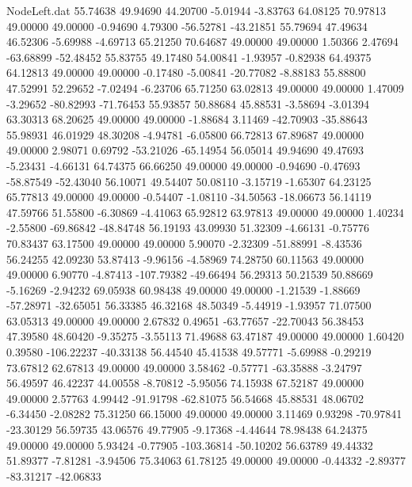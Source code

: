 \begin{filecontents}{NodeLeft.dat}
  55.74638   49.94690   44.20700    -5.01944   -3.83763   64.08125   70.97813   49.00000   49.00000   -0.94690    4.79300  -56.52781  -43.21851
  55.79694   47.49634   46.52306    -5.69988   -4.69713   65.21250   70.64687   49.00000   49.00000    1.50366    2.47694  -63.68899  -52.48452
  55.83755   49.17480   54.00841    -1.93957   -0.82938   64.49375   64.12813   49.00000   49.00000   -0.17480   -5.00841  -20.77082   -8.88183
  55.88800   47.52991   52.29652    -7.02494   -6.23706   65.71250   63.02813   49.00000   49.00000    1.47009   -3.29652  -80.82993  -71.76453
  55.93857   50.88684   45.88531    -3.58694   -3.01394   63.30313   68.20625   49.00000   49.00000   -1.88684    3.11469  -42.70903  -35.88643
  55.98931   46.01929   48.30208    -4.94781   -6.05800   66.72813   67.89687   49.00000   49.00000    2.98071    0.69792  -53.21026  -65.14954
  56.05014   49.94690   49.47693    -5.23431   -4.66131   64.74375   66.66250   49.00000   49.00000   -0.94690   -0.47693  -58.87549  -52.43040
  56.10071   49.54407   50.08110    -3.15719   -1.65307   64.23125   65.77813   49.00000   49.00000   -0.54407   -1.08110  -34.50563  -18.06673
  56.14119   47.59766   51.55800    -6.30869   -4.41063   65.92812   63.97813   49.00000   49.00000    1.40234   -2.55800  -69.86842  -48.84748
  56.19193   43.09930   51.32309    -4.66131   -0.75776   70.83437   63.17500   49.00000   49.00000    5.90070   -2.32309  -51.88991   -8.43536
  56.24255   42.09230   53.87413    -9.96156   -4.58969   74.28750   60.11563   49.00000   49.00000    6.90770   -4.87413 -107.79382  -49.66494
  56.29313   50.21539   50.88669    -5.16269   -2.94232   69.05938   60.98438   49.00000   49.00000   -1.21539   -1.88669  -57.28971  -32.65051
  56.33385   46.32168   48.50349    -5.44919   -1.93957   71.07500   63.05313   49.00000   49.00000    2.67832    0.49651  -63.77657  -22.70043
  56.38453   47.39580   48.60420    -9.35275   -3.55113   71.49688   63.47187   49.00000   49.00000    1.60420    0.39580 -106.22237  -40.33138
  56.44540   45.41538   49.57771    -5.69988   -0.29219   73.67812   62.67813   49.00000   49.00000    3.58462   -0.57771  -63.35888   -3.24797
  56.49597   46.42237   44.00558    -8.70812   -5.95056   74.15938   67.52187   49.00000   49.00000    2.57763    4.99442  -91.91798  -62.81075
  56.54668   45.88531   48.06702    -6.34450   -2.08282   75.31250   66.15000   49.00000   49.00000    3.11469    0.93298  -70.97841  -23.30129
  56.59735   43.06576   49.77905    -9.17368   -4.44644   78.98438   64.24375   49.00000   49.00000    5.93424   -0.77905 -103.36814  -50.10202
  56.63789   49.44332   51.89377    -7.81281   -3.94506   75.34063   61.78125   49.00000   49.00000   -0.44332   -2.89377  -83.31217  -42.06833

\end{filecontents}

